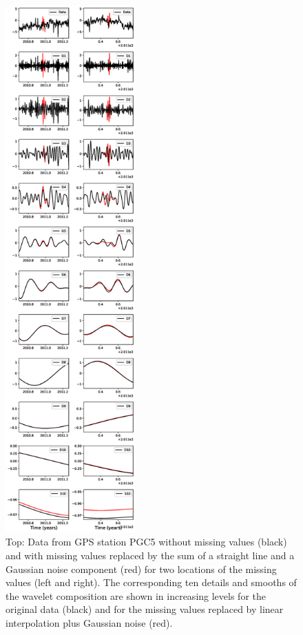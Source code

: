 \documentclass{article}
\begin{document}
\begin{figure}
\noindent\includegraphics[width=5cm, trim={0cm 0cm 0cm 0cm},clip]{figures/DS_10.eps}
\caption{Top: Data from GPS station PGC5 without missing values (black) and with missing values replaced by the sum of a straight line and a Gaussian noise component (red) for two locations of the missing values (left and right). The corresponding ten details and smooths of the wavelet composition are shown in increasing levels for the original data (black) and for the missing values replaced by linear interpolation plus Gaussian noise (red).}
\label{pngfiguresample}
\end{figure}
\end{document}
